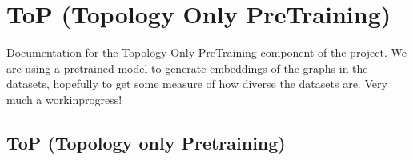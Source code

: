 \documentclass[letterpaper,10pt,english]{sphinxhowto}
\begin{document}
\section{ToP (Topology Only Pre\sphinxhyphen{}Training)}
\label{\detokenize{index:top-topology-only-pre-training}}
\sphinxAtStartPar
Documentation for the Topology Only Pre\sphinxhyphen{}Training component of the project.
We are using a pre\sphinxhyphen{}trained model to generate embeddings of the graphs in the datasets, hopefully to get some measure of how diverse the datasets are.
Very much a work\sphinxhyphen{}in\sphinxhyphen{}progress!

\sphinxstepscope


\subsection{ToP (Topology only Pre\sphinxhyphen{}training)}
\label{\detokenize{top:module-top}}\label{\detokenize{top:top-topology-only-pre-training}}\label{\detokenize{top::doc}}
\end{document}
